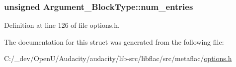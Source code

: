 \subsubsection[{\texorpdfstring{num\+\_\+entries}{num_entries}}]{\setlength{\rightskip}{0pt plus 5cm}unsigned Argument\+\_\+\+Block\+Type\+::num\+\_\+entries}\hypertarget{struct_argument___block_type_afc3c04eb2873d0631d2f575ed12b2bde}{}\label{struct_argument___block_type_afc3c04eb2873d0631d2f575ed12b2bde}


Definition at line 126 of file options.\+h.



The documentation for this struct was generated from the following file\+:\begin{DoxyCompactItemize}
\item 
C\+:/\+\_\+dev/\+Open\+U/\+Audacity/audacity/lib-\/src/libflac/src/metaflac/\hyperlink{libflac_2src_2metaflac_2options_8h}{options.\+h}\end{DoxyCompactItemize}
